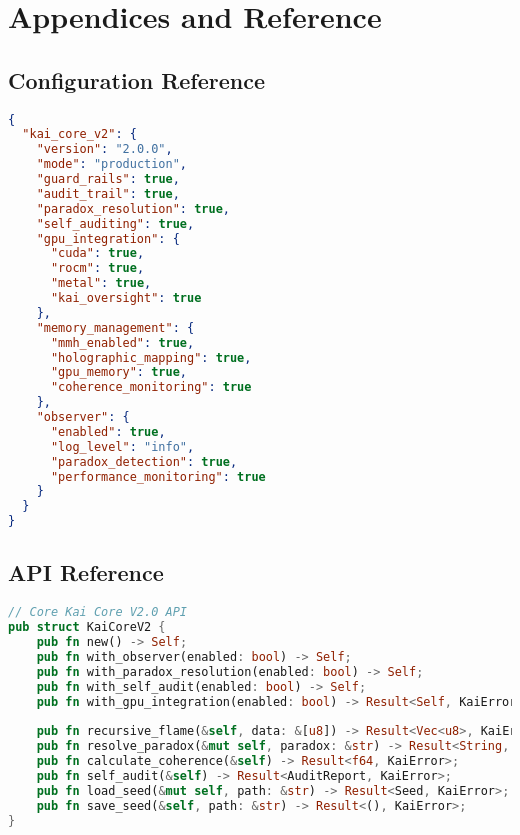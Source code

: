 \documentclass[11pt]{report}
\newcommand{\codebox}[2]{
  \begin{tcolorbox}[
    colback=gray!5,
    colframe=kai_blue,
    title=#1,
    fonttitle=\bfseries
  ]
  #2
  \end{tcolorbox}
}
\begin{document}
\chapter{Appendices and Reference}

\section{Configuration Reference}

\codebox{Complete Configuration}{
\begin{lstlisting}[language=json]
{
  "kai_core_v2": {
    "version": "2.0.0",
    "mode": "production",
    "guard_rails": true,
    "audit_trail": true,
    "paradox_resolution": true,
    "self_auditing": true,
    "gpu_integration": {
      "cuda": true,
      "rocm": true,
      "metal": true,
      "kai_oversight": true
    },
    "memory_management": {
      "mmh_enabled": true,
      "holographic_mapping": true,
      "gpu_memory": true,
      "coherence_monitoring": true
    },
    "observer": {
      "enabled": true,
      "log_level": "info",
      "paradox_detection": true,
      "performance_monitoring": true
    }
  }
}
\end{lstlisting}
}

\section{API Reference}

\codebox{Core API Functions}{
\begin{lstlisting}[language=rust]
// Core Kai Core V2.0 API
pub struct KaiCoreV2 {
    pub fn new() -> Self;
    pub fn with_observer(enabled: bool) -> Self;
    pub fn with_paradox_resolution(enabled: bool) -> Self;
    pub fn with_self_audit(enabled: bool) -> Self;
    pub fn with_gpu_integration(enabled: bool) -> Result<Self, KaiError>;
    
    pub fn recursive_flame(&self, data: &[u8]) -> Result<Vec<u8>, KaiError>;
    pub fn resolve_paradox(&mut self, paradox: &str) -> Result<String, KaiError>;
    pub fn calculate_coherence(&self) -> Result<f64, KaiError>;
    pub fn self_audit(&self) -> Result<AuditReport, KaiError>;
    pub fn load_seed(&mut self, path: &str) -> Result<Seed, KaiError>;
    pub fn save_seed(&self, path: &str) -> Result<(), KaiError>;
}
\end{lstlisting}
}
\end{document}

